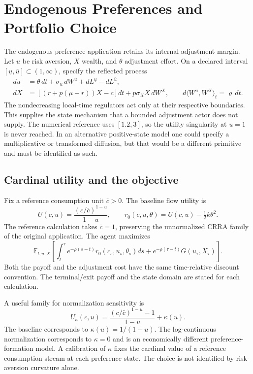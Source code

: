 \documentclass[ecta,draft]{econsocart}
\theoremstyle{definition}
\theoremstyle{remark}
\newcommand{\E}{\mathbb E}
\begin{document}
\section{Endogenous Preferences and Portfolio Choice}\label{sec:ndu}
The endogenous-preference application retains its internal adjustment margin. Let $u$ be risk aversion, $X$ wealth, and $\theta$ adjustment effort. On a declared interval $[\underline u,\bar u]\subset(1,\infty)$, specify the reflected process
\begin{align}
 du&=\theta\,dt+\sigma_u\,dW^u+dL^{\underline u}-dL^{\bar u},\label{eq:ndustate}\\
 dX&=[(r+p(\mu-r))X-c]dt+p\sigma_X X\,dW^X,
 \qquad d\langle W^u,W^X\rangle_t=\varrho\,dt.
\end{align}
The nondecreasing local-time regulators act only at their respective boundaries. This supplies the state mechanism that a bounded adjustment actor does not supply. The numerical reference uses $[1.2,3]$, so the utility singularity at $u=1$ is never reached. In an alternative positive-state model one could specify a multiplicative or transformed diffusion, but that would be a different primitive and must be identified as such.

\subsection{Cardinal utility and the objective}
Fix a reference consumption unit $\bar c>0$. The baseline flow utility is
\begin{equation}\label{eq:nduutility}
 U(c,u)=\frac{(c/\bar c)^{1-u}}{1-u},\qquad
 r_0(c,u,\theta)=U(c,u)-\tfrac12 k\theta^2.
\end{equation}
The reference calculation takes $\bar c=1$, preserving the unnormalized CRRA family of the original application. The agent maximizes
\begin{equation}\label{eq:nduobjective}
 \E_{t,u,X}\left[\int_t^\tau e^{-\rho(s-t)}r_0(c_s,u_s,\theta_s)ds
        +e^{-\rho(\tau-t)}G(u_\tau,X_\tau)\right].
\end{equation}
Both the payoff and the adjustment cost have the same time-relative discount convention. The terminal/exit payoff and the state domain are stated for each calculation.

A useful family for normalization sensitivity is
\[
 U_\kappa(c,u)=\frac{(c/\bar c)^{1-u}-1}{1-u}+\kappa(u).
\]
The baseline corresponds to $\kappa(u)=1/(1-u)$. The log-continuous normalization corresponds to $\kappa=0$ and is an economically different preference-formation model. A calibration of $\kappa$ fixes the cardinal value of a reference consumption stream at each preference state. The choice is not identified by risk-aversion curvature alone.
\end{document}
